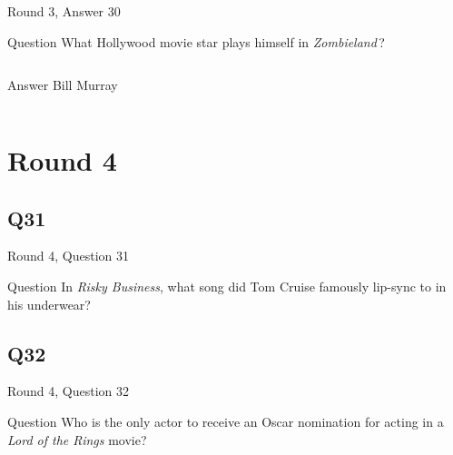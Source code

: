 \documentclass[11pt]{beamer}
\begin{document}
\begin{frame}[t]{Round 3, Answer 30}
\vspace{2em}
\begin{block}{Question}
What Hollywood movie star plays himself in \emph{Zombieland}\,?
\end{block}
\pause{}
\begin{columns}[T,totalwidth=\linewidth]
\begin{column}{0.35\linewidth}
\begin{block}{Answer}
Bill Murray
\end{block}
\end{column}
\begin{column}{0.6\linewidth}
\begin{center}
\texttt{[image: \{Images/bill-murrays-zombieland]}.jpg}
\end{center}
\end{column}
\end{columns}
\end{frame}
    

\section{Round 4}
    

\subsection*{Q31}
\begin{frame}[t]{Round 4, Question 31}
\vspace{2em}
\begin{block}{Question}
In \emph{Risky Business}, what song did Tom Cruise famously lip-sync to in his underwear?
\end{block}
\end{frame}
    

\subsection*{Q32}
\begin{frame}[t]{Round 4, Question 32}
\vspace{2em}
\begin{block}{Question}
Who is the only actor to receive an Oscar nomination for acting in a \emph{Lord of the Rings} movie?
\end{block}
\end{frame}
    
\end{document}
